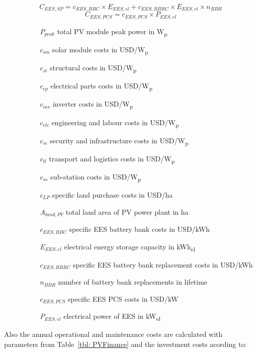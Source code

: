 \begin{equation}
C_{EES,SP} = c_{EES,BBC} \times E_{EES,el} + c_{EES,BBRC} \times E_{EES,el}  \times n_{BBR}
\end{equation}
\begin{equation}
C_{EES,PCS} = c_{EES,PCS} \times P_{EES,el}
\end{equation}
\begin{itemize}
\item[ ] 
\begin{itemize}
\item[ ] 
\begin{itemize}
\item[$P_{peak}$]total PV module peak power in W\textsubscript{p}
\item[$c_{sm}$]solar module costs in USD/W\textsubscript{p}
\item[$c_{st}$]structural costs in USD/W\textsubscript{p}
\item[$c_{ep}$]electrical parts costs in USD/W\textsubscript{p}
\item[$c_{inv}$]inverter costs in USD/W\textsubscript{p}
\item[$c_{elc}$]engineering and labour costs in USD/W\textsubscript{p}
\item[$c_{si}$]security and infrastructure costs in USD/W\textsubscript{p}
\item[$c_{tl}$]transport and logistics costs in USD/W\textsubscript{p}
\item[$c_{ss}$]sub-station costs in USD/W\textsubscript{p}
\item[$c_{LP}$]specific land purchase costs in USD/ha
\item[$A_{land,PV}$]total land area of PV power plant in ha
\item[$c_{EES,BBC} $]specific EES battery bank costs in USD/kWh\item[$E_{EES,el}$]electrical energy storage capacity in kWh\textsubscript{el}
\item[$c_{EES,BBRC}$]specific EES battery bank replacement costs in USD/kWh
\item[$n_{BBR}$]number of battery bank replacements in lifetime
\item[$c_{EES,PCS} $]specific EES PCS costs in USD/kW
\item[$P_{EES,el} $]electrical power of EES in kW\textsubscript{el}
\end{itemize}
\end{itemize}
\end{itemize}
Also the annual operational and maintenance costs are calculated with parameters from Table~\ref{tbl: PVFinance} and the investment costs acording to:
